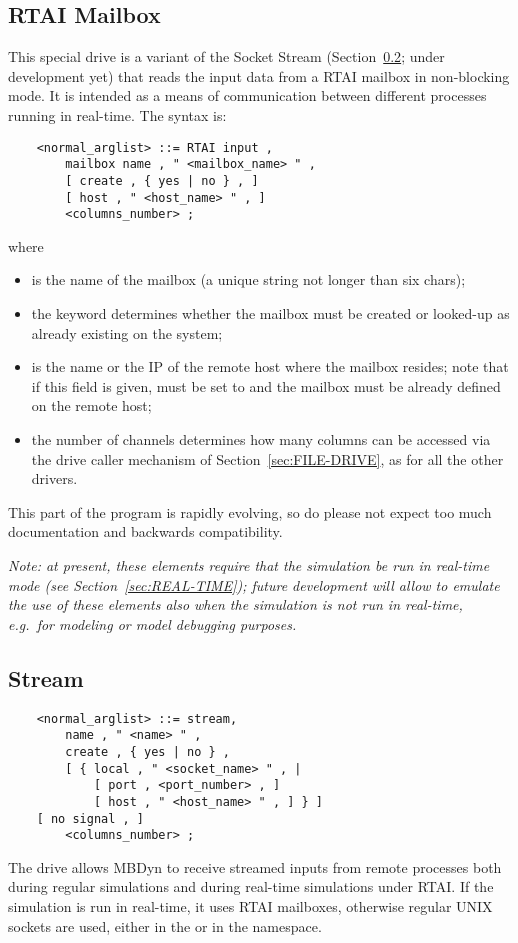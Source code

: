 \subsection{RTAI Mailbox}\label{sec:RTAI_in}
This special drive is a variant of the Socket Stream
(Section~\ref{sec:Stream}; under development yet)
that reads the input data from a RTAI mailbox in non-blocking mode.
It is intended as a means of communication between different processes
running in real-time.
The syntax is:
\begin{verbatim}
    <normal_arglist> ::= RTAI input ,
        mailbox name , " <mailbox_name> " ,
        [ create , { yes | no } , ]
        [ host , " <host_name> " , ]
        <columns_number> ;
\end{verbatim}
where
\begin{itemize}
\item {} is the name of the mailbox (a unique string 
not longer than six chars);
\item the  keyword determines whether the mailbox 
must be created or looked-up as already existing on the system;
\item {} is the name or the IP of the remote host where 
the mailbox resides; note that if this field is given,  must
be set to  and the mailbox must be already defined
on the remote host;
\item the number of channels  determines how many
columns can be accessed via the  drive caller mechanism 
of Section~\ref{sec:FILE-DRIVE}, as for all the other  drivers.
\end{itemize}
This part of the program is rapidly evolving, so do please not expect
too much documentation and backwards compatibility.

\emph{Note: at present, these elements require that the simulation
be run in real-time mode (see Section~\ref{sec:REAL-TIME});
future development will allow to emulate the use of these elements
also when the simulation is not run in real-time, e.g.\ for modeling
or model debugging purposes.}



\subsection{Stream}\label{sec:Stream}
\begin{verbatim}
    <normal_arglist> ::= stream,
        name , " <name> " ,
        create , { yes | no } ,
        [ { local , " <socket_name> " , |
            [ port , <port_number> , ]
            [ host , " <host_name> " , ] } ]
	[ no signal , ]
        <columns_number> ;
\end{verbatim}
The  drive allows MBDyn to receive streamed inputs 
from remote processes both during regular simulations and during 
real-time simulations under RTAI.
If the simulation is run in real-time, it uses RTAI mailboxes, 
otherwise regular UNIX sockets are used, either in the  or 
in the  namespace.

